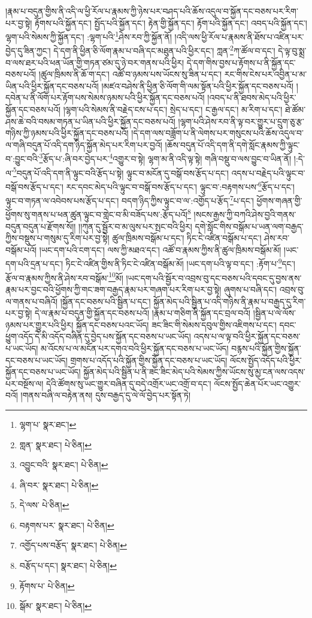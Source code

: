 །རྣམ་པ་བདུན་གྱིས་ནི་འདི་ལ་ཕྱི་རོལ་པ་རྣམས་ཀྱི་ཉེས་པར་བཤད་པའི་ཆོས་འདུལ་བ་སྐྱོན་དང་བཅས་པར་རིག་པར་བྱ་སྟེ། རྟོགས་པའི་སྐྱོན་དང་། སྤྱོད་པའི་སྐྱོན་དང་། རྟེན་གྱི་སྐྱོན་དང་། རྟོག་པའི་སྐྱོན་དང་། འབད་པའི་སྐྱོན་དང་། ལྷག་པའི་སེམས་ཀྱི་སྐྱོན་དང་། :ལྷག་པའི་\footnote{ལྷག་པ་  སྣར་ཐང་། }ཤེས་རབ་ཀྱི་སྐྱོན་ནོ། །འདི་ལས་ཕྱི་རོལ་པ་རྣམས་ནི་ཐོས་པ་འཛིན་པར་བྱེད་དུ་ཟིན་ཀྱང་། དེ་དག་ནི་ཕྱིན་ཅི་ལོག་རྣམ་པ་བཞི་དང་མཐུན་པའི་ཕྱིར་དང་། ཀླན་\footnote{གླན་  སྣར་ཐང་།  པེ་ཅིན། }ཀ་ཚོལ་བ་དང་། དེ་ལྟ་བུ་སྨྲ་བ་ལས་ཐར་པའི་ཕན་ཡོན་གྱི་གཏན་ཙམ་དུ་ཉེ་བར་གནས་པའི་ཕྱིར། དེ་དག་གིས་བྱས་པ་རྟོགས་པ་ནི་སྐྱོན་དང་བཅས་པའོ། །ཚུལ་ཁྲིམས་ནི་ཆོ་ག་དང་། འཚོ་བ་ཉམས་པས་ཡོངས་སུ་ཟིན་པ་དང་། རང་གིས་ངེས་པར་འབྱིན་པ་མ་ཡིན་པའི་ཕྱིར་སྐྱོན་དང་བཅས་པའོ། །མཛའ་བཤེས་ནི་ཕྱིན་ཅི་ལོག་གི་ལམ་སྟོན་པའི་ཕྱིར་སྐྱོན་དང་བཅས་པའོ། །དབེན་པ་ནི་ལོག་པར་རྟོག་པས་སེམས་ཉམས་པའི་ཕྱིར་སྐྱོན་དང་བཅས་པའོ། །འབད་པ་ནི་ཐབས་མེད་པའི་ཕྱིར་སྐྱོན་དང་བཅས་པའོ། །ལྷག་པའི་སེམས་ནི་བརྗེད་ངས་པ་དང་། སྲེད་པ་དང་། ང་རྒྱལ་དང་། མ་རིག་པ་དང་། ཐེ་ཚོམ་ཤས་ཆེ་བའི་བསམ་གཏན་པ་ཡིན་པའི་ཕྱིར་སྐྱོན་དང་བཅས་པའོ། །ལྷག་པའི་ཤེས་རབ་ནི་ལྟ་བར་གྱུར་པ་དྲུག་ཅུ་རྩ་གཉིས་ཀྱི་ཉམས་པའི་ཕྱིར་སྐྱོན་དང་བཅས་པའོ། །དེ་དག་ལས་བཟློག་པ་ནི་ལེགས་པར་གསུངས་པའི་ཆོས་འདུལ་བ་ལ་གཞི་བདུན་པོ་འདི་དག་ཉིད་སྐྱོན་མེད་པར་རིག་པར་བྱའོ། །ཆོས་བདུན་པོ་འདི་དག་ནི་དགེ་སློང་རྣམས་ཀྱི་ལྟུང་བ་:བྱུང་བའི་\footnote{འབྱུང་བའི་  སྣར་ཐང་།  པེ་ཅིན། }རྩོད་པ་:ཞི་བར་བྱེད་པར་\footnote{ཞི་བར་  སྣར་ཐང་།  པེ་ཅིན། }འགྱུར་བ་སྟེ། ལྷག་མ་ནི་འདི་ལྟ་སྟེ། གཞི་བསྡུ་བ་ལས་བྱུང་བ་ཡིན་ནོ། །:དེ་ལ་\footnote{དེ་ལས་  པེ་ཅིན། }བདུན་པོ་འདི་དག་ནི་ལྟུང་བའི་རྩོད་པ་སྟེ། ལྟུང་བ་མངོན་དུ་བསྒོ་བས་རྩོད་པ་དང་། འདས་པ་བརྗེད་པའི་ལྟུང་བ་བསྒོ་བས་རྩོད་པ་དང་། རང་དབང་མེད་པའི་ལྟུང་བ་བསྒོ་བས་རྩོད་པ་དང་། ལྟུང་བ་:བརྟགས་པས་\footnote{བརྟགས་པར་  སྣར་ཐང་།  པེ་ཅིན། }རྩོད་པ་དང་། ལྟུང་བ་གཏན་ལ་འབེབས་པས་རྩོད་པ་དང་། བདག་ཉིད་ཀྱིས་ལྟུང་བ་ལ་:འགྱོད་པ་རྩོད་\footnote{འགྱོད་པས་བརྩོད་  སྣར་ཐང་།  པེ་ཅིན། }པ་དང་། ཕྱོགས་གཞན་གྱི་ཕྱོགས་སུ་གནས་པ་ཕན་ཚུན་ལྟུང་བ་གླེང་བ་མི་བཟོད་པས་:རྩོད་པའོ།\footnote{བརྩོད་པ་དང་།  སྣར་ཐང་།  པེ་ཅིན། } །སངས་རྒྱས་ཀྱི་བཀའི་ཤེས་བྱའི་གནས་བདུན་བདུན་པ་རྫོགས་སོ།། །།ཀུན་དུ་སྦྱོར་བ་མ་ལུས་པར་སྤང་བའི་ཕྱིར། དགེ་སློང་གིས་བསྒོམ་པ་ཡན་ལག་བརྒྱད་ཀྱིས་བསྡུས་པ་གསུམ་དུ་རིག་པར་བྱ་སྟེ། ཚུལ་ཁྲིམས་བསྒོམ་པ་དང་། ཏིང་ངེ་འཛིན་བསྒོམ་པ་དང་། ཤེས་རབ་བསྒོམ་པའོ། །ཡང་དག་པའི་ངག་དང་། ལས་ཀྱི་མཐའ་དང་། འཚོ་བ་རྣམས་ཀྱིས་ནི་ཚུལ་ཁྲིམས་བསྒོམ་མོ། །ཡང་དག་པའི་དྲན་པ་དང་། ཏིང་ངེ་འཛིན་གྱིས་ནི་ཏིང་ངེ་འཛིན་བསྒོམ་མོ། །ཡང་དག་པའི་ལྟ་བ་དང་། :རྟོག་པ་\footnote{རྟོགས་པ་  པེ་ཅིན། }དང་། རྩོལ་བ་རྣམས་ཀྱིས་ནི་ཤེས་རབ་བསྒོམ་\footnote{སྒོམ་  སྣར་ཐང་།  པེ་ཅིན། }མོ། །ཡང་དག་པའི་སྦྱོར་བ་འབྲས་བུ་དང་བཅས་པའི་དབང་དུ་བྱས་ནས་རྣམ་པར་བྱང་བའི་ཕྱོགས་ཀྱི་གང་ཟག་བརྒྱད་རྣམ་པར་གཞག་པར་རིག་པར་བྱ་སྟེ། ཞུགས་པ་བཞི་དང་། འབྲས་བུ་ལ་གནས་པ་བཞིའོ། །སྐྱོན་དང་བཅས་པའི་སྦྱིན་པ་དང་། སྐྱོན་མེད་པའི་སྦྱིན་པ་འདི་གཉིས་ནི་རྣམ་པ་བརྒྱད་དུ་རིག་པར་བྱ་སྟེ། དེ་ལ་རྣམ་པ་བདུན་གྱི་སྐྱོན་དང་བཅས་པའོ། །རྣམ་པ་གཅིག་ནི་སྐྱོན་དང་བྲལ་བའོ། །སྦྱིན་པ་ལེ་ལོས་ཉམས་པར་གྱུར་པའི་ཕྱིར། སྐྱོན་དང་བཅས་པའང་ཡོད། ཟང་ཟིང་གི་སེམས་དབུལ་གྱིས་འཇིགས་པ་དང་། དབང་ཕྱུག་འདོད་དེ་མི་འདོད་བཞིན་དུ་བྱེད་པས་སྐྱོན་དང་བཅས་པ་ཡང་ཡོད། འདས་པ་ལ་ལྟ་བའི་ཕྱིར་སྐྱོན་དང་བཅས་པ་ཡང་ཡོད། མ་འོངས་པ་ལ་མངོན་པར་དགའ་བའི་ཕྱིར་སྐྱོན་དང་བཅས་པ་ཡང་ཡོད། བརྙས་པའི་སྐྱོན་གྱིས་སྐྱོན་དང་བཅས་པ་ཡང་ཡོད། གྲགས་པ་འདོད་པའི་སྐྱོན་གྱིས་སྐྱོན་དང་བཅས་པ་ཡང་ཡོད། ལོངས་སྤྱོད་འདོད་པའི་ཕྱིར་སྐྱོན་དང་བཅས་པ་ཡང་ཡོད། སྐྱོན་མེད་པའི་སྦྱིན་པ་ནི་ཟང་ཟིང་མེད་པའི་སེམས་ཀྱིས་ཡོངས་སུ་མྱ་ངན་ལས་འདས་པར་བསྔོས་ལ། དེའི་ཚོགས་སུ་ཡང་གྱུར་བཞིན་དུ་བདེ་འགྲོར་ཡང་འགྲོ་བ་དང་། ལོངས་སྤྱོད་ཆེན་པོར་ཡང་འགྱུར་བའོ། །གནས་བཞི་ལ་བརྟེན་ནས། དུས་བརྒྱད་དུ་ལེ་ལོ་བྱེད་པར་སྟོན་ཏེ། 